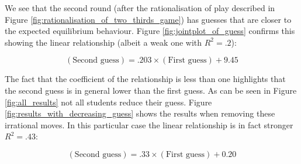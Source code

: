 \documentclass{article}
\begin{document}
We see that the second round (after the rationalisation of play described in
Figure \ref{fig:rationalisation_of_two_thirds_game}) has guesses that are closer
to the expected equilibrium behaviour.
Figure \ref{fig:jointplot_of_guess} confirms this showing the linear
relationship (albeit a weak one with \(R^2=.2\)):

\begin{equation}
    (\text{Second guess}) = .203\times(\text{First guess}) + 9.45
    \label{eq:linear_relationship}
\end{equation}

The fact that the coefficient of the relationship is less than one highlights
that the second guess is in general lower than the first guess. As can be seen
in Figure \ref{fig:all_results} not all students reduce their guess. Figure
\ref{fig:results_with_decreasing_guess} shows the results when removing these
irrational moves. In this particular case the linear relationship is in fact
stronger \(R^2=.43\):

\begin{equation}
    (\text{Second guess}) = .33\times(\text{First guess}) + 0.20
    \label{eq:linear_relationship_for_increasing_guesses}
\end{equation}
\end{document}
